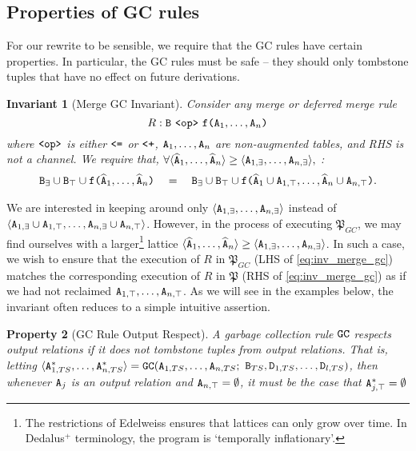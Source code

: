 \documentclass{article}
\numberwithin{equation}{section}
\newtheorem{property}{Property}[section]
\newtheorem{invariant}[property]{Invariant}
\renewcommand{\tt}[1]{\ifmmode\text{\texttt{#1}}\else\texttt{#1}\fi}
\begin{document}
\subsection{Properties of GC rules}
For our rewrite to be sensible, we require that the GC rules have certain properties.
In particular, the GC rules must be safe -- they should only tombstone tuples that have no effect on future derivations.

\begin{invariant}[Merge GC Invariant]\label{inv:merge_gc}
Consider any merge or deferred merge rule 
\[R: \tt{B} ~\tt{<op>}~ \tt{f(}\tt{A}_1,\dots,\tt{A}_n\tt{)}\]
where $\tt{<op>}$ is either $\tt{<=}$ or $\tt{<+}$,
$\tt{A}_1,\dots,\tt{A}_n$ are non-augmented tables,
and RHS is not a channel.
We require that, 
$\forall \langle \widehat{\tt{A}}_1, \dots, \widehat{\tt{A}}_n\rangle \geq \langle \tt{A}_{1,\exists},\dots,\tt{A}_{n,\exists} \rangle,$
:
\begin{align}
\tt{B}_\exists\cup \tt{B}_\top
\cup
\tt{f(}\widehat{\tt{A}}_1,\dots,\widehat{\tt{A}}_n\tt{)}
\quad=\quad
\tt{B}_\exists\cup \tt{B}_\top
\cup
\tt{f(}\widehat{\tt{A}}_1 \cup \tt{A}_{1,\top},\dots,\widehat{\tt{A}}_n \cup \tt{A}_{n,\top}\tt{)}.
\label{eq:inv_merge_gc}
\end{align}
\end{invariant}

We are interested in keeping around only $\langle \tt{A}_{1,\exists},\dots,\tt{A}_{n,\exists} \rangle$ instead of $\langle \tt{A}_{1,\exists} \cup \tt{A}_{1,\top}, \dots, \tt{A}_{n,\exists}  \cup \tt{A}_{n,\top}\rangle$.
However, in the process of executing $\mathfrak{P}_{GC}$, we may find ourselves with a larger\footnote{
	The restrictions of Edelweiss ensures that lattices can only grow over time.
    In Dedalus$^+$ terminology, the program is `temporally inflationary'.
} lattice $\langle \widehat{\tt{A}}_1, \dots, \widehat{\tt{A}}_n\rangle \geq \langle \tt{A}_{1,\exists},\dots,\tt{A}_{n,\exists} \rangle$.
In such a case, we wish to ensure that the execution of $R$ in $\mathfrak{P}_{GC}$ (LHS of \eqref{eq:inv_merge_gc}) matches the corresponding execution of $R$ in $\mathfrak{P}$ (RHS of \eqref{eq:inv_merge_gc}) as if we had not reclaimed $\tt{A}_{1,\top}, \dots, \tt{A}_{n,\top}$.
As we will see in the examples below, the invariant often reduces to a simple intuitive assertion.

\begin{property}[GC Rule Output Respect]
A garbage collection rule $\tt{GC}$ \emph{respects output relations} if it does not tombstone tuples from output relations.
That is, letting $\langle \tt{A}_{1,TS}^*, \dots, \tt{A}_{n,TS}^* \rangle = \tt{GC}(\tt{A}_{1,TS}, \dots, \tt{A}_{n,TS};$ $\tt{B}_{TS}, \tt{D}_{1,TS}, \dots, \tt{D}_{l,TS})$, then whenever $\tt{A}_j$ is an output relation and $\tt{A}_{n,\top} = \emptyset$, it must be the case that $\tt{A}_{j,\top}^* = \emptyset$
\end{property}
\end{document}
